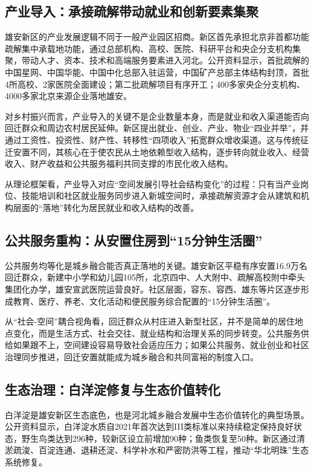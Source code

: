 \documentclass[UTF8,zihao=-4]{ctexart}
\begin{document}
\subsection{产业导入：承接疏解带动就业和创新要素集聚}

雄安新区的产业发展逻辑不同于一般产业园区招商。新区首先承担北京非首都功能疏解集中承载地功能，通过总部机构、高校、医院、科研平台和央企分支机构集聚，带动人才、资本、技术和高端服务要素进入河北。公开资料显示，首批疏解的中国星网、中国华能、中国中化总部入驻运营，中国矿产总部主体结构封顶，首批4所高校、2家医院全面建设；第二批疏解项目有序开工；400多家央企分支机构、4000多家北京来源企业落地雄安。

对乡村振兴而言，产业导入的关键不是企业数量本身，而是就业和收入渠道能否向回迁群众和周边农村居民延伸。新区提出就业、创业、产业、物业“四业并举”，并通过工资性、投资性、财产性、转移性“四项收入”拓宽群众增收渠道。这与传统征迁安置不同，其核心在于使农民从土地依赖型收入结构，逐步转向就业收入、经营收入、财产收益和公共服务福利共同支撑的市民化收入结构。

从理论框架看，产业导入对应“空间发展引导社会结构变化”的过程：只有当产业岗位、技能培训和社区就业服务同步进入新城空间时，承接疏解资源才会从建筑和机构层面的“落地”转化为居民就业和收入结构的改善。

\subsection{公共服务重构：从安置住房到“15分钟生活圈”}

公共服务均等化是城乡融合能否真正落地的关键。雄安新区平稳有序安置16.9万名回迁群众，新建中小学和幼儿园105所，北京四中、人大附中、疏解高校附中牵头集团化办学，雄安宣武医院运营良好。社区层面，容东、容西、雄东等片区逐步形成教育、医疗、养老、文化活动和便民服务综合配置的“15分钟生活圈”。

从“社会-空间”耦合视角看，回迁群众从村庄进入新型社区，并不是简单的居住地点变化，而是生活方式、社会交往、就业结构和治理关系的同步转变。公共服务供给如果跟不上，空间建设容易导致社会适应压力；如果公共服务、就业创业和社区治理同步推进，回迁安置就能成为城乡融合和共同富裕的制度入口。

\subsection{生态治理：白洋淀修复与生态价值转化}

白洋淀是雄安新区生态底色，也是河北城乡融合发展中生态价值转化的典型场景。公开资料显示，白洋淀水质自2021年首次达到III类标准以来持续稳定保持良好状态，野生鸟类达到296种，较新区设立前增加90种；鱼类恢复至50种。新区通过清淤疏浚、百淀连通、退耕还淀、科学补水和严密防洪等工程，推动“华北明珠”生态系统修复。
\end{document}
